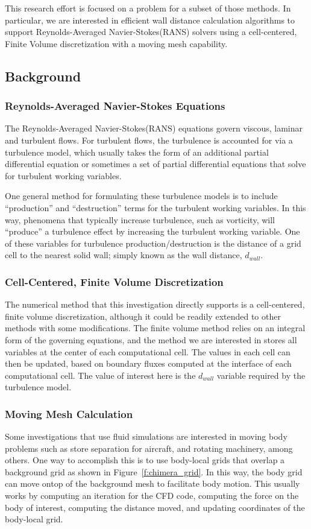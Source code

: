\documentclass[]{aiaa-tc}%
\begin{document}
This research effort is focused on a problem for a subset
of those methods. In particular, we are interested in efficient wall
distance calculation algorithms to support Reynolds-Averaged
Navier-Stokes(RANS) solvers using a cell-centered, Finite Volume discretization with a
moving mesh capability.

\subsection{Background}

\subsubsection{Reynolds-Averaged Navier-Stokes Equations}
The Reynolds-Averaged Navier-Stokes(RANS) equations govern viscous, laminar
and turbulent flows. For turbulent flows, the turbulence is accounted
for via a turbulence model, which usually takes the
form of an additional partial differential equation or sometimes a set
of partial differential equations that solve for turbulent working
variables.

One general method for formulating these turbulence models is to
include ``production'' and ``destruction'' terms for the turbulent
working variables. In this way, phenomena that typically increase
turbulence, such as vorticity, will ``produce'' a turbulence effect by
increasing the turbulent working variable. One of these variables for
turbulence production/destruction is the distance of a grid cell to
the nearest solid wall; simply known as the wall distance, $d_{wall}$.


\subsubsection{Cell-Centered, Finite Volume Discretization}
The numerical method that this investigation directly supports is a
cell-centered, finite volume discretization, although it could be
readily extended to other methods with some modifications. The finite
volume method relies on an integral form of the governing equations,
and the method we are interested in stores all variables at the center
of each computational cell. The values in each cell can then be
updated, based on boundary fluxes computed at the interface of each
computational cell. The value of interest here is the $d_{wall}$
variable required by the turbulence model.

\subsubsection{Moving Mesh Calculation}
Some investigations that use fluid simulations are interested in moving
body problems such as store separation for aircraft, and rotating
machinery, among others. One way to accomplish this is to use
body-local grids that overlap a background grid as shown in Figure~\ref{f:chimera_grid}. In this way, the body
grid can move ontop of the background mesh to facilitate body motion. This
usually works by computing an iteration for the CFD code, computing
the force on the body of interest, computing the distance moved, and
updating coordinates of the body-local grid.
\end{document}
